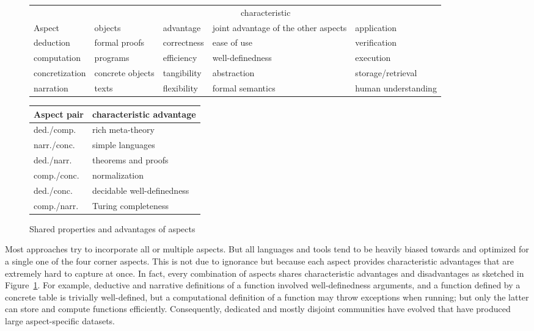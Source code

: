 \begin{figure}[htb]\centering\footnotesize\setlength{\tabcolsep}{4pt}
\begin{tabular}{|l|llp{2.1cm}l|}\hline
       & \multicolumn{4}{c|}{characteristic} \\
Aspect &  objects & advantage & joint advantage of the other aspects & application \\\hline
deduction & formal proofs & correctness & ease of use & verification \\
computation & programs & efficiency & well-definedness & execution\\
concretization & concrete objects & tangibility & abstraction & storage/retrieval\\
narration & texts & flexibility & formal semantics & human understanding\\\hline
\end{tabular}
\quad
\begin{tabular}{|l|l|}\hline
Aspect pair & characteristic advantage \\\hline
ded./comp.  & rich meta-theory \\
narr./conc. & simple languages \\\hline
ded./narr.  & theorems and proofs \\
comp./conc. & normalization \\\hline
ded./conc.  & decidable well-definedness \\
comp./narr. & Turing completeness \\\hline
\end{tabular}
\caption{Shared properties and advantages of aspects}\label{fig:tetrapod2}
\end{figure}

Most approaches try to incorporate all or multiple aspects.
But all languages and tools tend to be heavily biased towards and optimized for a single one of the four corner aspects.
This is not due to ignorance but because each aspect provides characteristic advantages that are extremely hard to capture at once.
In fact, every combination of aspects shares characteristic advantages and disadvantages as sketched in Figure~\ref{fig:tetrapod2}.
For example, deductive and narrative definitions of a function involved well-definedness arguments, and a function defined by a concrete table is trivially well-defined, but a computational definition of a function may throw exceptions when running; but only the latter can store and compute functions efficiently.
Consequently, dedicated and mostly disjoint communities have evolved that have produced large aspect-specific datasets.

